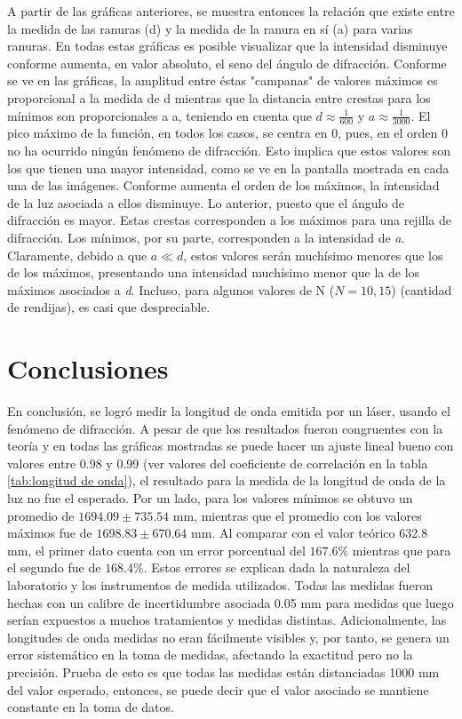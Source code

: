 \documentclass[%
 reprint,
 amsmath,amssymb,
 aps,
]{revtex4-1}
\begin{document}
A partir de las gráficas anteriores, se muestra entonces la relación que existe entre la medida de las ranuras (d) y la medida de la ranura en sí (a) para varias ranuras. En todas estas gráficas es posible visualizar que la intensidad disminuye conforme aumenta, en valor absoluto, el seno del ángulo de difracción. Conforme se ve en las gráficas, la amplitud entre éstas "campanas" de valores máximos es proporcional a la medida de d mientras que la distancia entre crestas para los mínimos son proporcionales a a, teniendo en cuenta que $d \approx \frac{1}{600}$ y $a \approx \frac{1}{3000}$. El pico máximo de la función, en todos los casos, se centra en 0, pues, en el orden 0 no ha ocurrido ningún fenómeno de difracción. Esto implica que estos valores son los que tienen una mayor intensidad, como se ve en la pantalla mostrada en cada una de las imágenes. Conforme aumenta el orden de los máximos, la intensidad de la luz asociada a ellos disminuye. Lo anterior, puesto que el ángulo de difracción es mayor. Estas crestas corresponden a los máximos para una rejilla de difracción. Los mínimos, por su parte, corresponden a la intensidad de \textit{a}. Claramente, debido a que $a \ll d$, estos valores serán muchísimo menores que los de los máximos, presentando una intensidad muchísimo menor que la de los máximos asociados a \textit{d}. Incluso, para algunos valores de N ($N = 10,15$) (cantidad de rendijas), es casi que despreciable.  


\section{\label{conclusiones} Conclusiones}

En conclusión, se logró medir la longitud de onda emitida por un láser, usando el fenómeno de difracción. A pesar de que los resultados fueron congruentes con la teoría y en todas las gráficas mostradas se puede hacer un ajuste lineal bueno con valores entre 0.98 y 0.99 (ver valores del coeficiente de correlación en la tabla \ref{tab:longitud de onda}), el resultado para la medida de la longitud de onda de la luz no fue el esperado. Por un lado, para los valores mínimos se obtuvo un promedio de $1694.09 \pm 735.54$ mm, mientras que el promedio con los valores máximos fue de $1698.83 \pm 670.64$ mm. Al comparar con el valor teórico 632.8 mm, el primer dato cuenta con un error porcentual del $167.6\%$ mientras que para el segundo fue de $168.4\%$. Estos errores se explican dada la naturaleza del laboratorio y los instrumentos de medida utilizados. Todas las medidas fueron hechas con un calibre de incertidumbre asociada 0.05 mm para medidas que luego serían expuestos a muchos tratamientos y medidas distintas. Adicionalmente, las longitudes de onda medidas no eran fácilmente visibles y, por tanto, se genera un error sistemático en la toma de medidas, afectando la exactitud pero no la precisión. Prueba de esto es que todas las medidas están distanciadas 1000 mm del valor esperado, entonces, se puede decir que el valor asociado se mantiene constante en la toma de datos.
\end{document}
